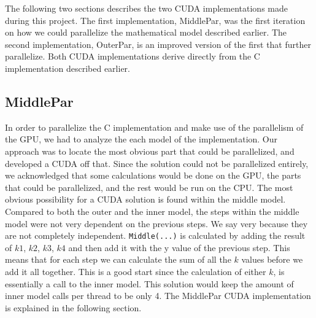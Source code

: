 The following two sections describes the two CUDA implementations made during this project. The first implementation, MiddlePar, was the first iteration on how we could parallelize the mathematical model described earlier. The second implementation, OuterPar, is an improved version of the first that further parallelize. Both CUDA implementations derive directly from the C implementation described earlier.

\subsection{MiddlePar}
In order to parallelize the C implementation and make use of the parallelism of the GPU, we had to analyze the each model of the implementation. Our approach was to locate the most obvious part that could be parallelized, and developed a CUDA off that. Since the solution could not be parallelized entirely, we acknowledged that some calculations would be done on the GPU, the parts that could be parallelized, and the rest would be run on the CPU. The most obvious possibility for a CUDA solution is found within the middle model. Compared to both the outer and the inner model, the steps within the middle model were not very dependent on the previous steps. We say very because they are not completely independent. \texttt{Middle(...)} is calculated by adding the result of $k1$, $k2$, $k3$, $k4$ and then add it with the y value of the previous step. This means that for each step we can calculate the sum of all the $k$ values before we add it all together. This is a good start since the calculation of either $k$, is essentially a call to the inner model. This solution would keep the amount of inner model calls per thread to be only 4. The MiddlePar CUDA implementation is explained in the following section.

